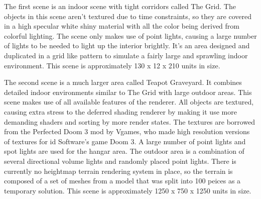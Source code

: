 \documentclass[12pt]{ucthesis}
\begin{document}
The first scene is an indoor scene with tight corridors called The Grid.
The objects in this scene aren't textured due to time constraints, so they are covered in a high specular white shiny material with all the color being derived from colorful lighting.
The scene only makes use of point lights, causing a large number of lights to be needed to light up the interior brightly.
It's an area designed and duplicated in a grid like pattern to simulate a fairly large and sprawling indoor environment.
This scene is approximately 130 x 12 x 210 units in size.

The second scene is a much larger area called Teapot Graveyard.
It combines detailed indoor environments similar to The Grid with large outdoor areas.
This scene makes use of all available features of the renderer.
All objects are textured, causing extra stress to the deferred shading renderer by making it use more demanding shaders and sorting by more render states.
The textures are borrowed from the Perfected Doom 3 mod by Vgames, who made high resolution versions of textures for id Software's game Doom 3.\cite{Perf-Doom3}
A large number of point lights and spot lights are used for the hangar area.
The outdoor area is a combination of several directional volume lights and randomly placed point lights.
There is currently no heightmap terrain rendering system in place, so the terrain is composed of a set of meshes from a model that was split into 100 peices as a temporary solution.
This scene is approximately 1250 x 750 x 1250 units in size.
\end{document}
